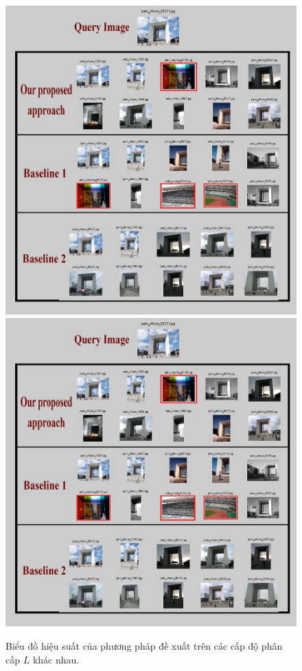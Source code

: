 \begin{figure}[!htbp]
  \begin{center}
    \leavevmode
    \ifpdf
      \includegraphics[scale=0.2]{resParis6k}
    \else
      \includegraphics[scale=0.2]{resParis6k}
    \fi
    \caption[Biểu đồ hiệu suất của phương pháp đề xuất trên các cấp độ phân cấp khác nhau]{Biểu đồ hiệu suất của phương pháp đề xuất trên các cấp độ phân cấp $L$ khác nhau.}
    \label{FigResultsParis}
  \end{center}
\end{figure}

